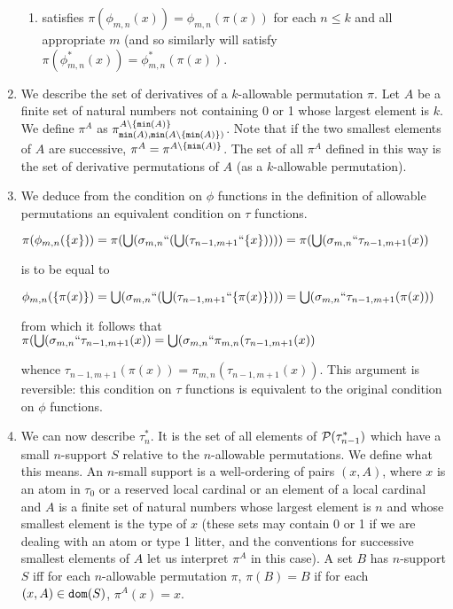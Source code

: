 \documentclass[12pt]{article}
\begin{document}
\begin{enumerate}
\begin{enumerate}
\item satisfies $\pi(\phi_{m,n}(x)) = \phi_{m,n}(\pi(x))$ for each $n \leq k$ and all appropriate $m$ (and so similarly will satisfy $\pi(\phi^*_{m,n}(x)) = \phi^*_{m,n}(\pi(x))$.

\end{enumerate}

\item  We describe the set of derivatives of a $k$-allowable permutation $\pi$.  Let $A$ be a finite set of natural numbers not containing 0 or 1 whose largest element is $k$.  We define $\pi^A$ as $\pi^{A \setminus \{{\tt min}(A)\}}_{{\tt min}(A),{\tt min}(A \setminus \{{\tt min}(A)\})}$.  Note that if the two smallest elements of $A$ are successive, $\pi^A = \pi^{A \setminus \{{\tt min}(A)\}}$.  The set of all $\pi^A$ defined in this way is the set of derivative permutations of $A$ (as a $k$-allowable permutation).

\item  We deduce from the condition on $\phi$ functions in the definition of allowable permutations an equivalent condition on $\tau$ functions.

$\pi(\phi_{m,n}(\{x\})) = \pi(\bigcup (\sigma_{m,n}``(\bigcup(\tau_{n-1,m+1}``\{x\})))) = \pi(\bigcup(\sigma_{m,n}``\tau_{n-1,m+1}(x))$

is to be equal to

$\phi_{m,n}(\{\pi(x)\}) = \bigcup (\sigma_{m,n}``(\bigcup(\tau_{n-1,m+1}``\{\pi(x)\}))) = \bigcup(\sigma_{m,n}``\tau_{n-1,m+1}(\pi(x)))$

from which it follows that $\pi(\bigcup(\sigma_{m,n}``\tau_{n-1,m+1}(x))=\bigcup(\sigma_{m,n}``\pi_{m,n}(\tau_{n-1,m+1}(x))$

whence $\tau_{n-1,m+1}(\pi(x)) = \pi_{m,n}(\tau_{n-1,m+1}(x))$.  This argument is reversible:  this condition on $\tau$ functions is equivalent to the original condition on $\phi$ functions.

\item We can now describe $\tau^*_n$.  It is the set of all elements of ${\cal P}(\tau^*_{n-1})$ which have a small $n$-support $S$ relative to the $n$-allowable permutations.  We define what this means.
An $n$-small support is a well-ordering of pairs $(x,A)$, where $x$ is an atom in $\tau_0$ or a reserved local cardinal or an element of a local cardinal and $A$ is a finite set of natural numbers whose largest element is $n$ and whose smallest element is the type of $x$ (these sets may contain 0 or 1 if we are dealing with an atom or type 1 litter, and the conventions for successive smallest elements of $A$ let us interpret $\pi^A$ in this case).  A set $B$ has $n$-support $S$ iff for each $n$-allowable permutation $\pi$, $\pi(B)=B$ if for each $(x,A) \in {\tt dom}(S)$, $\pi^A(x)=x$.


\end{enumerate}
\end{document}
